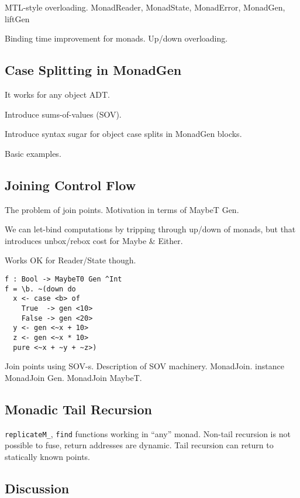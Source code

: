 \documentclass[acmsmall,screen,review,anonymous]{acmart}
\theoremstyle{remark}
\begin{document}
MTL-style overloading. MonadReader, MonadState, MonadError, MonadGen, liftGen

Binding time improvement for monads. Up/down overloading.

\subsection{Case Splitting in MonadGen}\label{sec:case-splitting-in-monadgen}

It works for any object ADT.

Introduce sums-of-values (SOV).

Introduce syntax sugar for object case splits in MonadGen blocks.

Basic examples.

\subsection{Joining Control Flow}\label{sec:rejoining-control-flow}

The problem of join points. Motivation in terms of MaybeT Gen.

We can let-bind computations by tripping through up/down of monads,
but that introduces unbox/rebox cost for Maybe \& Either.

Works OK for Reader/State though.

\begin{verbatim}
f : Bool -> MaybeT0 Gen ^Int
f = \b. ~(down do
  x <- case <b> of
    True  -> gen <10>
    False -> gen <20>
  y <- gen <~x + 10>
  z <- gen <~x * 10>
  pure <~x + ~y + ~z>)
\end{verbatim}

Join points using SOV-s. Description of SOV machinery. MonadJoin.
instance MonadJoin Gen. MonadJoin MaybeT.

\subsection{Monadic Tail Recursion}\label{sec:monadic-tail-recursion}

\texttt{replicateM\_}, \texttt{find} functions working in ``any'' monad.
Non-tail recursion is not possible to fuse, return addresses are dynamic.
Tail recursion can return to statically known points.

\subsection{Discussion}
\end{document}
